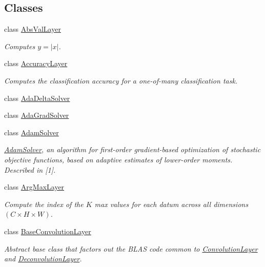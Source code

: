 \subsection*{Classes}
\begin{DoxyCompactItemize}
\item 
class \hyperlink{classcaffe_1_1AbsValLayer}{Abs\+Val\+Layer}
\begin{DoxyCompactList}\small\item\em Computes $ y = |x| $. \end{DoxyCompactList}\item 
class \hyperlink{classcaffe_1_1AccuracyLayer}{Accuracy\+Layer}
\begin{DoxyCompactList}\small\item\em Computes the classification accuracy for a one-\/of-\/many classification task. \end{DoxyCompactList}\item 
class \hyperlink{classcaffe_1_1AdaDeltaSolver}{Ada\+Delta\+Solver}
\item 
class \hyperlink{classcaffe_1_1AdaGradSolver}{Ada\+Grad\+Solver}
\item 
class \hyperlink{classcaffe_1_1AdamSolver}{Adam\+Solver}
\begin{DoxyCompactList}\small\item\em \hyperlink{classcaffe_1_1AdamSolver}{Adam\+Solver}, an algorithm for first-\/order gradient-\/based optimization of stochastic objective functions, based on adaptive estimates of lower-\/order moments. Described in \mbox{[}1\mbox{]}. \end{DoxyCompactList}\item 
class \hyperlink{classcaffe_1_1ArgMaxLayer}{Arg\+Max\+Layer}
\begin{DoxyCompactList}\small\item\em Compute the index of the $ K $ max values for each datum across all dimensions $ (C \times H \times W) $. \end{DoxyCompactList}\item 
class \hyperlink{classcaffe_1_1BaseConvolutionLayer}{Base\+Convolution\+Layer}
\begin{DoxyCompactList}\small\item\em Abstract base class that factors out the B\+L\+AS code common to \hyperlink{classcaffe_1_1ConvolutionLayer}{Convolution\+Layer} and \hyperlink{classcaffe_1_1DeconvolutionLayer}{Deconvolution\+Layer}. \end{DoxyCompactList}\item 

\end{DoxyCompactItemize}
